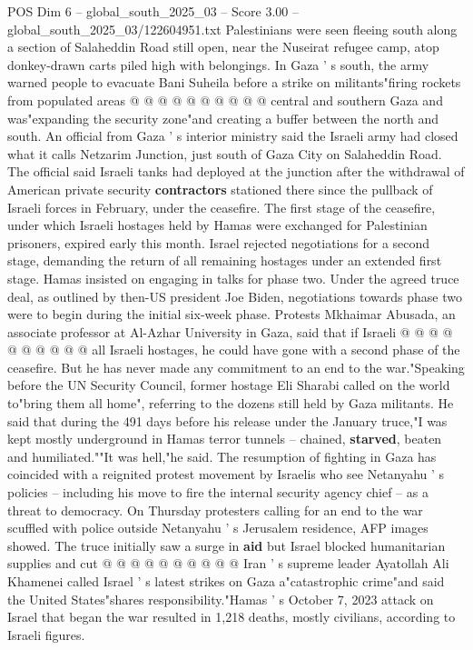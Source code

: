 \begin{textsample}{POS Dim 6 – global\_south\_2025\_03 – Score 3.00 – global\_south\_2025\_03/122604951.txt}
Palestinians were seen fleeing south along a section of Salaheddin Road still open, near the Nuseirat refugee camp, atop donkey-drawn carts piled high with belongings.
In Gaza ' s south, the army warned people to evacuate Bani Suheila before a strike on militants"firing rockets from populated areas @ @ @ @ @ @ @ @ @ @ central and southern Gaza and was"expanding the security zone"and creating a buffer between the north and south.
An official from Gaza ' s interior ministry said the Israeli army had closed what it calls Netzarim Junction, just south of Gaza City on Salaheddin Road.
The official said Israeli tanks had deployed at the junction after the withdrawal of American private security \textbf{contractors} stationed there since the pullback of Israeli forces in February, under the ceasefire.
The first stage of the ceasefire, under which Israeli hostages held by Hamas were exchanged for Palestinian prisoners, expired early this month.
Israel rejected negotiations for a second stage, demanding the return of all remaining hostages under an extended first stage.
Hamas insisted on engaging in talks for phase two.
Under the agreed truce deal, as outlined by then-US president Joe Biden, negotiations towards phase two were to begin during the initial six-week phase.
Protests Mkhaimar Abusada, an associate professor at Al-Azhar University in Gaza, said that if Israeli @ @ @ @ @ @ @ @ @ @ all Israeli hostages, he could have gone with a second phase of the ceasefire.
But he has never made any commitment to an end to the war."Speaking before the UN Security Council, former hostage Eli Sharabi called on the world to"bring them all home", referring to the dozens still held by Gaza militants.
He said that during the 491 days before his release under the January truce,"I was kept mostly underground in Hamas terror tunnels -- chained, \textbf{starved}, beaten and humiliated.""It was hell,"he said.
The resumption of fighting in Gaza has coincided with a reignited protest movement by Israelis who see Netanyahu ' s policies -- including his move to fire the internal security agency chief -- as a threat to democracy.
On Thursday protesters calling for an end to the war scuffled with police outside Netanyahu ' s Jerusalem residence, AFP images showed.
The truce initially saw a surge in \textbf{aid} but Israel blocked humanitarian supplies and cut @ @ @ @ @ @ @ @ @ @ Iran ' s supreme leader Ayatollah Ali Khamenei called Israel ' s latest strikes on Gaza a"catastrophic crime"and said the United States"shares responsibility."Hamas ' s October 7, 2023 attack on Israel that began the war resulted in 1,218 deaths, mostly civilians, according to Israeli figures.

\end{textsample}
